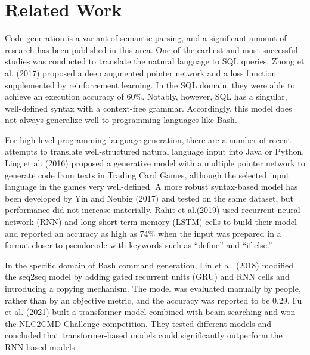 \section{Related Work}
Code generation is a variant of semantic parsing, and a significant amount of
research has been published in this area. One of the earliest and most
successful studies was conducted to translate the natural language to SQL
queries. Zhong et al. (2017) \cite{zhong2017seq2sql} proposed a deep
augmented pointer network and a loss function supplemented by reinforcement
learning. In the SQL domain, they were able to achieve an execution accuracy of
60\%. Notably, however, SQL has a singular, well-defined syntax with a
context-free grammar. Accordingly, this model does not always generalize well
to programming languages like Bash.
\par
For high-level programming language generation, there are a number of recent
attempts to translate well-structured natural language input into Java or
Python.  Ling et al. (2016) \cite{ling2016latent} proposed a generative model
with a multiple pointer network to generate code from texts in Trading Card
Games, although the selected input language in the games very well-defined. A
more robust syntax-based model has been developed by Yin and Neubig (2017)
\cite{yin2017syntactic} and tested on the same dataset, but performance did not
increase materially. Rahit et al.(2019) \cite{rahit2019machine} used recurrent
neural network (RNN) and long-short term memory (LSTM) cells to build their model and
reported an accuracy as high as 74\% when the input was prepared in a format
closer to pseudocode with keywords such as ``define'' and ``if-else.''
\par
In the specific domain of Bash command generation, Lin et al. (2018)
\cite{lin2018nl2bash} modified the seq2seq model by adding gated recurrent
units (GRU) and RNN cells and introducing a copying mechanism. The model was
evaluated manually by people, rather than by an objective metric, and the
accuracy was reported to be 0.29. Fu et al. (2021) \cite{Fu2021ATransform}
built a transformer model combined with beam searching and won the NLC2CMD
Challenge competition. They tested different models and concluded that
transformer-based models could significantly outperform the RNN-based models.
